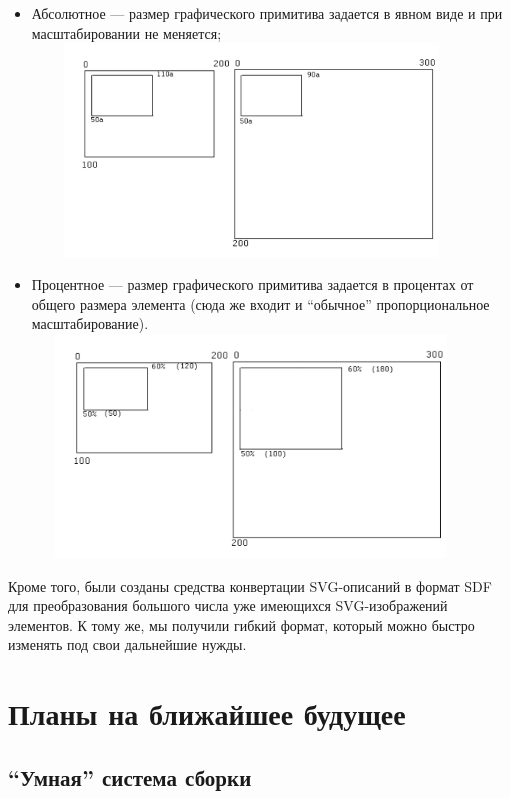 \documentclass[a5paper]{article}
\begin{document}
\begin{itemize}
  \item Абсолютное --- размер графического примитива задается в явном виде и при
        масштабировании не меняется;\newline
    \includegraphics[width=11.622cm,height=5.646cm]{draft04-img4.jpg}
  \item Процентное --- размер графического примитива задается в процентах от
        общего размера элемента (сюда же входит и ``обычное'' пропорциональное
        масштабирование).\newline
    \includegraphics[width=11.582cm,height=5.927cm]{draft04-img5.jpg}
\end{itemize}

Кроме того, были созданы средства конвертации SVG-описаний в формат SDF
для преобразования большого числа уже имеющихся SVG-изображений
элементов. К тому же, мы получили гибкий формат, который можно быстро
изменять под свои дальнейшие нужды.

\section{Планы на ближайшее будущее}
\subsection{``Умная'' система сборки}
\end{document}
